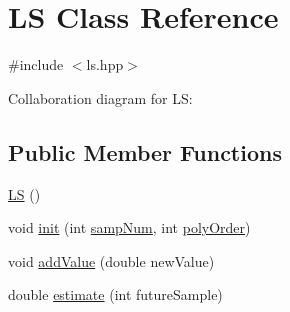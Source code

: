 \hypertarget{class_l_s}{}\section{LS Class Reference}
\label{class_l_s}


{\ttfamily \#include $<$ls.\+hpp$>$}



Collaboration diagram for LS\+:
\subsection*{Public Member Functions}
\begin{DoxyCompactItemize}
\item 
\hyperlink{class_l_s_a94d725a8af0cd80b3dfdabf57fea4c4b}{LS} ()
\item 
void \hyperlink{class_l_s_a8f84bed13c9bf083beac8e5530d8832d}{init} (int \hyperlink{class_l_s_a333c6e0be784cffd2f97f46803c5ba15}{samp\+Num}, int \hyperlink{class_l_s_aecf61c51ef6717acc81b737e298e4236}{poly\+Order})
\item 
void \hyperlink{class_l_s_ac3843acd150a8668c7bdff35f080d902}{add\+Value} (double new\+Value)
\item 
double \hyperlink{class_l_s_a595c287e25fe0d0d51e7f06a80f8f991}{estimate} (int future\+Sample)
\end{DoxyCompactItemize}
